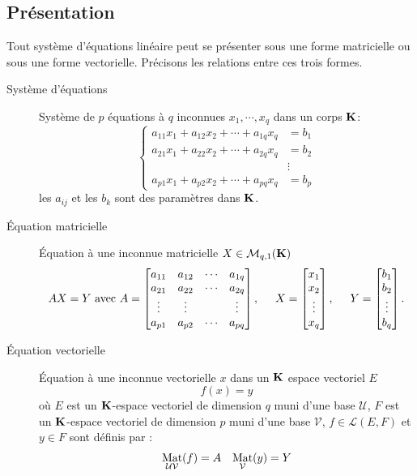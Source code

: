 \subsection{Présentation}
Tout système d'équations linéaire peut se présenter sous une forme matricielle ou sous une forme vectorielle. Précisons les relations entre ces trois formes.
\begin{description}
 \item[Système d'équations]
Système de $p$ équations à $q$ inconnues $x_1,\cdots, x_q$ dans un corps $\mathbf{K}$:
\begin{displaymath}
 \left\lbrace
\begin{aligned}
 a_{11}x_1+a_{12}x_2+\cdots +a_{1q}x_q &= b_1 \\
 a_{21}x_1+a_{22}x_2+\cdots +a_{2q}x_q &= b_2 \\
   &\vdots \\
a_{p1}x_1+a_{p2}x_2+\cdots +a_{pq}x_q &= b_p 
\end{aligned}
\right. 
\end{displaymath}
les $a_{ij}$ et les $b_k$ sont des paramètres dans $\mathbf{K}$.

\item [\'Equation matricielle]
\'Equation à une inconnue matricielle $X\in \mathcal M_{q,1}(\mathbf{K})$
\begin{displaymath}
 AX = Y \text{ avec }  A=\begin{bmatrix}
a_{11} & a_{12} & \cdots & a_{1q} \\
a_{21} & a_{22} & \cdots & a_{2q} \\
 \vdots  & \vdots &        & \vdots \\
a_{p1}& a_{p2} & \cdots & a_{pq}
   \end{bmatrix}
, \hspace{0.5cm}
X = \begin{bmatrix}
   x_1\\
   x_2\\
   \vdots \\
   x_q
  \end{bmatrix}
, \hspace{0.5cm}
Y=\begin{bmatrix}
   b_1\\
   b_2\\
   \vdots \\
   b_q
  \end{bmatrix} .
\end{displaymath}

\item[\'Equation vectorielle]
\'Equation à une inconnue vectorielle $x$ dans un $\mathbf{K}$ espace vectoriel $E$
\begin{displaymath}
 f(x)=y
\end{displaymath}
où $E$ est un $\mathbf{K}$-espace vectoriel de dimension $q$ muni d'une base $\mathcal U$, $F$ est un $\mathbf{K}$-espace vectoriel de dimension $p$ muni d'une base $\mathcal V$, $f\in \mathcal L(E,F)$ et $y\in F$ sont définis par :
\begin{align*}
 \mathop{\mathrm{Mat}}_{\mathcal U \mathcal V}(f) = A & & \mathop{\mathrm{Mat}}_{\mathcal V}(y) = Y
\end{align*}
\end{description}

